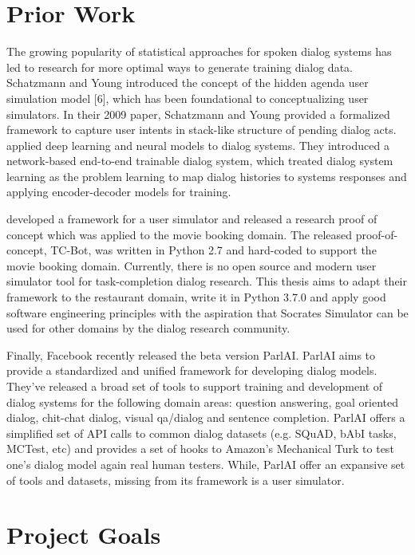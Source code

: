 \section{Prior Work}
\label{sec:priorworks}

The growing popularity of statistical approaches for spoken dialog systems has led to research for more optimal ways to generate training dialog data. Schatzmann and Young introduced the concept of the hidden agenda user simulation model [6], which has been foundational to conceptualizing user simulators. In their 2009 paper, Schatzmann and Young provided a formalized framework to capture user intents in stack-like structure of pending dialog acts. \cite{BordesW16} applied deep learning and neural models to dialog systems. They introduced a network-based end-to-end trainable dialog system, which treated dialog system learning as the problem learning to map dialog histories to systems responses and applying encoder-decoder models for training. 

\cite{li_usersim} developed a framework for a user simulator and released a research proof of concept which was applied to the movie booking domain. The released proof-of-concept, TC-Bot, was written in Python 2.7 and hard-coded to support the movie booking domain. Currently, there is no open source and modern user simulator tool for task-completion dialog research. This thesis aims to adapt their framework to the restaurant domain, write it in Python 3.7.0 and apply good software engineering principles with the aspiration that Socrates Simulator can be used for other domains by the dialog research community. 

Finally, Facebook recently released the beta version ParlAI. ParlAI aims to provide a standardized and unified framework for developing dialog models. They’ve released a broad set of tools to support training and development of dialog systems for the following domain areas: question answering, goal oriented dialog, chit-chat dialog, visual qa/dialog and sentence completion. ParlAI offers a simplified set of API calls to common dialog datasets (e.g. SQuAD, bAbI tasks, MCTest, etc) and provides a set of hooks to Amazon’s Mechanical Turk to test one’s dialog model again real human testers. While, ParlAI offer an expansive set of tools and datasets, missing from its framework is a user simulator. 

\section{Project Goals}

